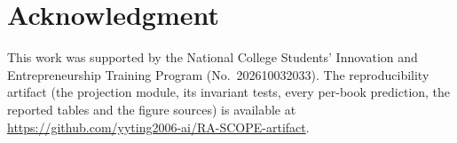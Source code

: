 \documentclass[conference]{IEEEtran}
\begin{document}
\section*{Acknowledgment}

This work was supported by the National College Students' Innovation and
Entrepreneurship Training Program (No.~202610032033). The reproducibility
artifact (the projection module, its invariant tests, every per-book
prediction, the reported tables and the figure sources) is available at
\url{https://github.com/yyting2006-ai/RA-SCOPE-artifact}.



\end{document}
